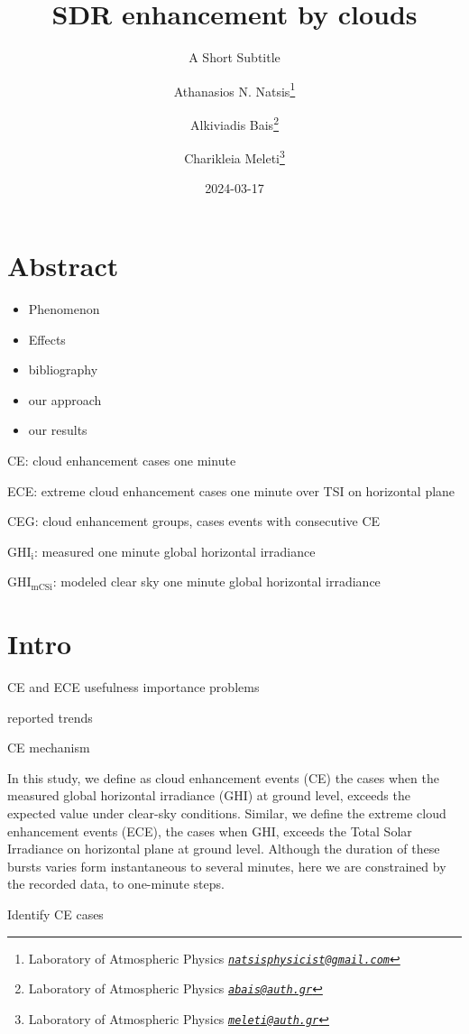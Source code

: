 \documentclass[
]{article}
\title{SDR enhancement by clouds}
\subtitle{A Short Subtitle}
\author{Athanasios N. Natsis\footnote{Laboratory of Atmospheric Physics \emph{\href{mailto:natsisphysicist@gmail.com}{\nolinkurl{natsisphysicist@gmail.com}}}} \and Alkiviadis Bais\footnote{Laboratory of Atmospheric Physics \emph{\href{mailto:abais@auth.gr}{\nolinkurl{abais@auth.gr}}}} \and Charikleia Meleti\footnote{Laboratory of Atmospheric Physics \emph{\href{mailto:meleti@auth.gr}{\nolinkurl{meleti@auth.gr}}}}}
\date{2024-03-17}
\providecommand{\tightlist}{%
  \setlength{\itemsep}{0pt}\setlength{\parskip}{0pt}}
\begin{document}
\maketitle

{
\setcounter{tocdepth}{4}
\tableofcontents
}
\hypertarget{abstract}{%
\section*{Abstract}\label{abstract}}

\begin{itemize}
\tightlist
\item
  Phenomenon
\item
  Effects
\item
  bibliography
\item
  our approach
\item
  our results
\end{itemize}

CE: cloud enhancement cases one minute

ECE: extreme cloud enhancement cases one minute over TSI on horizontal plane

CEG: cloud enhancement groups, cases events with consecutive CE

\(\text{GHI}_\text{i}\): measured one minute global horizontal irradiance

\(\text{GHI}_\text{mCSi}\): modeled clear sky one minute global horizontal irradiance

\hypertarget{intro}{%
\section{Intro}\label{intro}}

CE and ECE usefulness
importance
problems

reported trends

CE mechanism

In this study, we define as cloud enhancement events (CE) the cases when the measured
global horizontal irradiance (GHI) at ground level, exceeds the expected value under
clear-sky conditions.
Similar, we define the extreme cloud enhancement events (ECE), the cases when GHI,
exceeds the Total Solar Irradiance on horizontal plane at ground level.
Although the duration of these bursts varies form instantaneous to several minutes,
here we are constrained by the recorded data, to one-minute steps.

Identify CE cases
\end{document}
